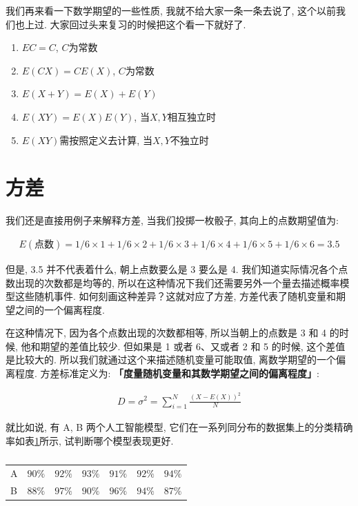 我们再来看一下数学期望的一些性质, 我就不给大家一条一条去说了, 这个以前我们也上过. 大家回过头来复习的时候把这个看一下就好了. 

\begin{enumerate}
  \item $EC = C$, $C$为常数
  \item $E(CX) = CE(X)$, $C$为常数
  \item $E(X + Y) = E(X) + E(Y)$
  \item $E(XY) = E(X)E(Y)$, 当$X,Y$相互独立时
  \item $E(XY)$需按照定义去计算, 当$X,Y$不独立时
\end{enumerate}

\section{方差}

我们还是直接用例子来解释方差, 当我们投掷一枚骰子, 其向上的点数期望值为: 

\begin{align*}
  E(\mbox{点数})  = 1/6 \times 1 + 1/6 \times 2 + 1/6 \times 3 + 1/6 \times 4 + 1/6 \times 5 + 1/6 \times 6 = 3.5
\end{align*}

但是, 3.5 并不代表着什么, 朝上点数要么是 3 要么是 4. 我们知道实际情况各个点数出现的次数都是均等的, 所以在这种情况下我们还需要另外一个量去描述概率模型这些随机事件. 如何刻画这种差异？这就对应了方差, 方差代表了随机变量和期望之间的一个偏离程度. 

在这种情况下, 因为各个点数出现的次数都相等, 所以当朝上的点数是 3 和 4 的时候, 他和期望的差值比较少. 但如果是 1 或者 6、又或者 2 和 5 的时候, 这个差值是比较大的. 所以我们就通过这个来描述随机变量可能取值, 离数学期望的一个偏离程度. 方差标准定义为: \textbf{「度量随机变量和其数学期望之间的偏离程度」}: 

\begin{align*}
  D = \sigma ^ 2 = \sum_{i=1}^N \frac{(X-E(X))^2}{N}
\end{align*}

就比如说, 有 A, B 两个人工智能模型, 它们在一系列同分布的数据集上的分类精确率如表\ref{tab:table22_1}所示, 试判断哪个模型表现更好. 

\begin{table}[ht]
  \centering
  \begin{tabular}{lllllll}
    \midrule
      A & $90\%$ & $92\%$ & $93\%$ & $91\%$ & $92\%$ & $94\%$  \\
      B & $88\%$ & $97\%$ & $90\%$ & $96\%$ & $94\%$ & $87\%$  \\
    \bottomrule
  \end{tabular}
  \caption{}
  \label{tab:table22_1}
\end{table}

